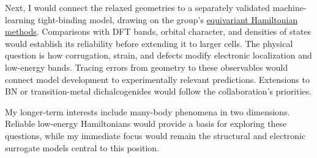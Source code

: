 \documentclass[12pt,a4paper]{article}
\begin{document}
Next, I would connect the relaxed geometries to a separately validated machine-learning tight-binding model, drawing on the group's \href{https://doi.org/10.1038/s41524-022-00843-2}{equivariant Hamiltonian methods}.
Comparisons with DFT bands, orbital character, and densities of states would establish its reliability before extending it to larger cells.
The physical question is how corrugation, strain, and defects modify electronic localization and low-energy bands.
Tracing errors from geometry to these observables would connect model development to experimentally relevant predictions.
Extensions to BN or transition-metal dichalcogenides would follow the collaboration's priorities.

My longer-term interests include many-body phenomena in two dimensions.
Reliable low-energy Hamiltonians would provide a basis for exploring these questions, while my immediate focus would remain the structural and electronic surrogate models central to this position.
\end{document}
